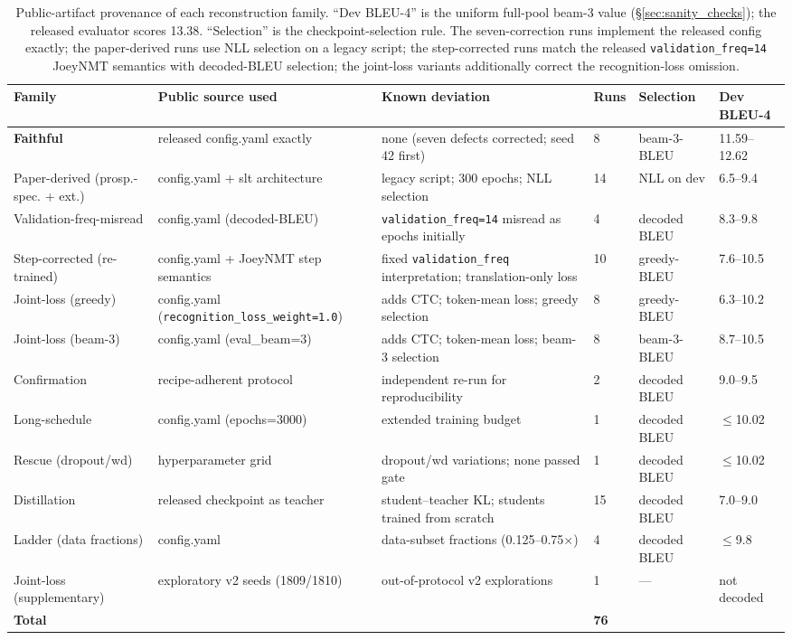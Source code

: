 \documentclass[pdflatex,sn-chicago]{sn-jnl}
\begin{document}
\begin{table}[h]
\centering
\scriptsize\setlength{\tabcolsep}{2pt}
\caption{Public-artifact provenance of each reconstruction family. ``Dev BLEU-4'' is the uniform full-pool beam-3 value (\S\ref{sec:sanity_checks}); the released evaluator scores 13.38. ``Selection'' is the checkpoint-selection rule. The seven-correction runs implement the released config exactly; the paper-derived runs use NLL selection on a legacy script; the step-corrected runs match the released \texttt{validation\_freq=14} JoeyNMT semantics with decoded-BLEU selection; the joint-loss variants additionally correct the recognition-loss omission.}
\label{tab:public_provenance}
\begin{tabular}{p{2.2cm}p{3.0cm}p{3.5cm}p{0.8cm}p{1.5cm}p{1.2cm}}
\toprule
Family & Public source used & Known deviation & Runs & Selection & Dev BLEU-4 \\
\midrule
\textbf{Faithful} & released config.yaml exactly & none (seven defects corrected; seed 42 first) & 8 & beam-3-BLEU & 11.59--12.62 \\
Paper-derived (prosp.-spec. + ext.) & config.yaml + slt architecture & legacy script; 300 epochs; NLL selection & 14 & NLL on dev & 6.5--9.4 \\
Validation-freq-misread & config.yaml (decoded-BLEU) & \texttt{validation\_freq=14} misread as epochs initially & 4 & decoded BLEU & 8.3--9.8 \\
Step-corrected (re-trained) & config.yaml + JoeyNMT step semantics & fixed \texttt{validation\_freq} interpretation; translation-only loss & 10 & greedy-BLEU & 7.6--10.5 \\
Joint-loss (greedy) & config.yaml (\texttt{recognition\_loss\_weight=1.0}) & adds CTC; token-mean loss; greedy selection & 8 & greedy-BLEU & 6.3--10.2 \\
Joint-loss (beam-3) & config.yaml (eval\_beam=3) & adds CTC; token-mean loss; beam-3 selection & 8 & beam-3-BLEU & 8.7--10.5 \\
Confirmation & recipe-adherent protocol & independent re-run for reproducibility & 2 & decoded BLEU & 9.0--9.5 \\
Long-schedule & config.yaml (epochs=3000) & extended training budget & 1 & decoded BLEU & $\leq$10.02 \\
Rescue (dropout/wd) & hyperparameter grid & dropout/wd variations; none passed gate & 1 & decoded BLEU & $\leq$10.02 \\
Distillation & released checkpoint as teacher & student--teacher KL; students trained from scratch & 15 & decoded BLEU & 7.0--9.0 \\
Ladder (data fractions) & config.yaml & data-subset fractions (0.125--0.75$\times$) & 4 & decoded BLEU & $\leq$9.8 \\
Joint-loss (supplementary) & exploratory v2 seeds (1809/1810) & out-of-protocol v2 explorations & 1 & --- & not decoded \\
\midrule
\textbf{Total} & & & \textbf{76} & & \\
\bottomrule
\end{tabular}
\end{table}
\end{document}
